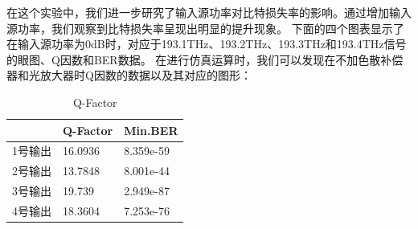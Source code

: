 \documentclass[12pt]{article}
\begin{document}
在这个实验中，我们进一步研究了输入源功率对比特损失率的影响。通过增加输入源功率，我们观察到比特损失率呈现出明显的提升现象。
下面的四个图表显示了在输入源功率为0dB时，对应于193.1THz、193.2THz、193.3THz和193.4THz信号的眼图、Q因数和BER数据。
在进行仿真运算时，我们可以发现在不加色散补偿器和光放大器时Q因数的数据以及其对应的图形：
\begin{table}[H]
  \centering
  \caption{Q-Factor}
  \begin{tabular}{|l|l|l|} 
  \hline
    & Q-Factor & Min.BER    \\ 
  \hline
  1号输出 & 16.0936  & 8.359e-59  \\ 
  \hline
  2号输出 & 13.7848  & 8.001e-44  \\ 
  \hline
  3号输出 & 19.739   & 2.949e-87  \\ 
  \hline
  4号输出 & 18.3604  & 7.253e-76  \\
  \hline
  \end{tabular}
  \end{table}
\end{document}
